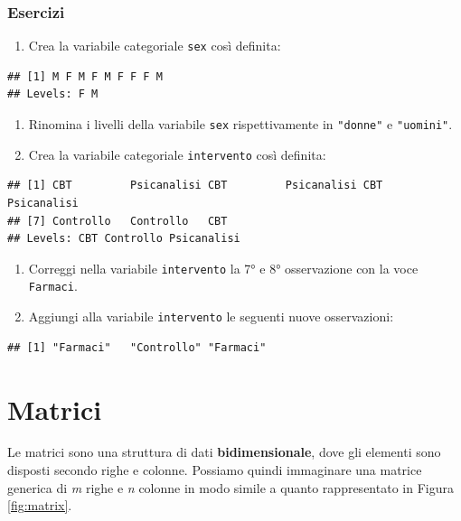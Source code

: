 \documentclass[
]{book}
\providecommand{\tightlist}{%
  \setlength{\itemsep}{0pt}\setlength{\parskip}{0pt}}
\begin{document}
\hypertarget{esercizi-5}{%
\subsection*{Esercizi}\label{esercizi-5}}

\begin{enumerate}
\def\labelenumi{\arabic{enumi}.}
\tightlist
\item
  Crea la variabile categoriale \texttt{sex} così definita:
\end{enumerate}

\begin{verbatim}
## [1] M F M F M F F F M
## Levels: F M
\end{verbatim}

\begin{enumerate}
\def\labelenumi{\arabic{enumi}.}
\setcounter{enumi}{1}
\tightlist
\item
  Rinomina i livelli della variabile \texttt{sex} rispettivamente in \texttt{"donne"} e \texttt{"uomini"}.
\item
  Crea la variabile categoriale \texttt{intervento} così definita:
\end{enumerate}

\begin{verbatim}
## [1] CBT         Psicanalisi CBT         Psicanalisi CBT         Psicanalisi
## [7] Controllo   Controllo   CBT        
## Levels: CBT Controllo Psicanalisi
\end{verbatim}

\begin{enumerate}
\def\labelenumi{\arabic{enumi}.}
\setcounter{enumi}{3}
\tightlist
\item
  Correggi nella variabile \texttt{intervento} la 7° e 8° osservazione con la voce \texttt{Farmaci}.
\item
  Aggiungi alla variabile \texttt{intervento} le seguenti nuove osservazioni:
\end{enumerate}

\begin{verbatim}
## [1] "Farmaci"   "Controllo" "Farmaci"
\end{verbatim}

\hypertarget{matrix}{%
\chapter{Matrici}\label{matrix}}

Le matrici sono una struttura di dati \textbf{bidimensionale}, dove gli elementi sono disposti secondo righe e colonne. Possiamo quindi immaginare una matrice generica di \emph{m} righe e \emph{n} colonne in modo simile a quanto rappresentato in Figura \ref{fig:matrix}.
\end{document}
